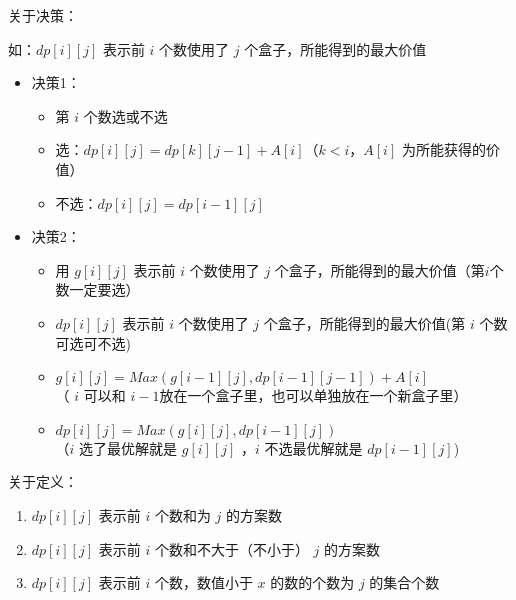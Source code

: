 \documentclass[E:/GsjzTle/main/main.tex]{subfiles}
\begin{document}
关于决策：

如：\(dp[i][j]\) 表示前 \(i\) 个数使用了 \(j\)
个盒子，所能得到的最大价值

\begin{itemize}
\item
  决策1：

  \begin{itemize}
  \item
    第 \(i\) 个数选或不选
  \item
    选：\(dp[i][j] = dp[k][j - 1] + A[i]\)（\(k <i\)，\(A[i]\)
    为所能获得的价值）
  \item
    不选：\(dp[i][j] = dp[i - 1][j]\)
  \end{itemize}
\item
  决策2：

  \begin{itemize}
  \item
    用 \(g[i][j]\) 表示前 \(i\) 个数使用了 \(j\)
    个盒子，所能得到的最大价值（第\(i\)个数一定要选）
  \item
    \(dp[i][j]\) 表示前 \(i\) 个数使用了 \(j\)
    个盒子，所能得到的最大价值(第 \(i\) 个数可选可不选)
  \item
    \(g[i][j] = Max(g[i-1][j],dp[i - 1][j - 1]) + A[i]\) \\
    （ \(i\) 可以和 \(i-1\)放在一个盒子里，也可以单独放在一个新盒子里）
  \item
    \(dp[i][j] = Max(g[i][j],dp[i - 1][j])\)\\
    （\(i\) 选了最优解就是 \(g[i][j]\) ，\(i\) 不选最优解就是
    \(dp[i - 1][j]\))
  \end{itemize}
\end{itemize}

关于定义：

\begin{enumerate}
\def\labelenumi{\arabic{enumi}.}
\item
  \(dp[i][j]\) 表示前 \(i\) 个数和为 \(j\) 的方案数
\item
  \(dp[i][j]\) 表示前 \(i\) 个数和不大于（不小于） \(j\) 的方案数
\item
  \(dp[i][j]\) 表示前 \(i\) 个数，数值小于 \(x\) 的数的个数为 \(j\)
  的集合个数
\end{enumerate}
\end{document}
